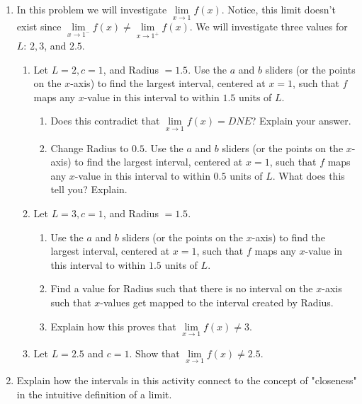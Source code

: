 \documentclass[handout,nooutcomes,noauthor,12pt]{Ximera}
\begin{document}
\begin{enumerate}[label=\arabic*]
		\item In this problem we will investigate $ \lim\limits_{x \to 1}f(x) $.  Notice, this limit doesn't exist since $ \lim\limits_{x \to 1^-}f(x) \neq \lim\limits_{x \to 1^+}f(x) $.  We will investigate three values for $ L $: $ 2, 3 $, and $ 2.5 $.
		\begin{enumerate}[label=\alph*]
			\item Let $ L=2, c=1 $, and Radius $ =1.5 $.  Use the $ a $ and $ b $ sliders (or the points on the $ x $-axis) to find the largest interval, centered at $ x=1 $, such that $ f $ maps any $x$-value in this interval to within $ 1.5 $ units of $ L $.
			\vspace{1.5cm}
			\begin{enumerate}
				\item Does this contradict that $ \lim\limits_{x \to 1}f(x) = DNE$?  Explain your answer.
				\item Change Radius to $ 0.5 $.  Use the $ a $ and $ b $ sliders (or the points on the $ x $-axis) to find the largest interval, centered at $ x=1 $, such that $ f $ maps any $x$-value in this interval to within $ 0.5 $ units of $ L $.  What does this tell you?  Explain.
			\end{enumerate}
		
			\clearpage
			
			\item Let $ L=3, c=1 $, and Radius $ =1.5 $.
			\begin{enumerate}
				\item Use the $ a $ and $ b $ sliders (or the points on the $ x $-axis) to find the largest interval, centered at $ x=1 $, such that $ f $ maps any $x$-value in this interval to within $ 1.5 $ units of $ L $.
				\item Find a value for Radius such that there is no interval on the $x$-axis such that $x$-values get mapped to the interval created  by Radius.
				\item Explain how this proves that $ \lim\limits_{x \to 1}f(x) \neq 3 $.
			\end{enumerate}
		
			\clearpage
		
			\item Let $L=2.5$ and $c=1$.  Show that $ \lim\limits_{x \to 1}f(x) \neq 2.5 $.
		\end{enumerate}
		\item Explain how the intervals in this activity connect to the concept of "closeness" in the intuitive definition of a limit.
	\end{enumerate}
\end{document}
